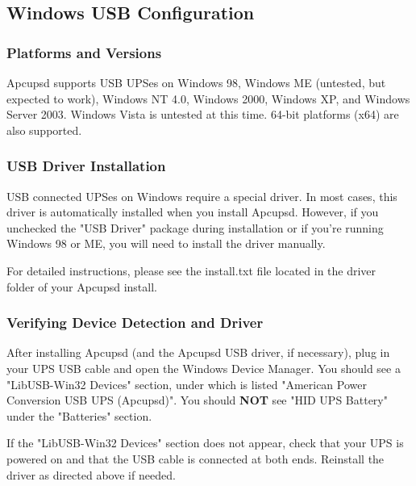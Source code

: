 \subsection*{Windows USB Configuration}

\subsubsection*{Platforms and Versions}

Apcupsd supports USB UPSes on Windows 98, Windows ME (untested, but
expected to work), Windows NT 4.0, Windows 2000, Windows XP, and 
Windows Server 2003. Windows Vista is untested at this time. 64-bit
platforms (x64) are also supported.

\subsubsection*{USB Driver Installation}

USB connected UPSes on Windows require a special driver. In most cases, 
this driver is automatically installed when you install Apcupsd. However,
if you unchecked the "USB Driver" package during installation or if you're
running Windows 98 or ME, you will need to install the driver manually.

For detailed instructions, please see the install.txt file located in
the driver\\ folder of your Apcupsd install.

\subsubsection*{Verifying Device Detection and Driver}

After installing Apcupsd (and the Apcupsd USB driver, if necessary),
plug in your UPS USB cable and open the Windows Device Manager. You 
should see a "LibUSB-Win32 Devices" section, under which is listed 
"American Power Conversion USB UPS (Apcupsd)". You should {\bf NOT}
see "HID UPS Battery" under the "Batteries" section.

If the "LibUSB-Win32 Devices" section does not appear, check that
your UPS is powered on and that the USB cable is connected at
both ends. Reinstall the driver as directed above if needed.


